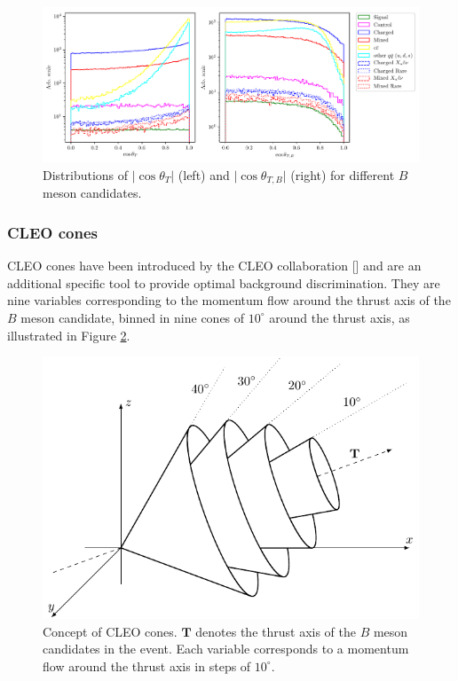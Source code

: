 \documentclass[  headings=standardclasses,
  headings=big,oneside,a4paper,openany,12pt]{scrbook}
\begin{document}
\begin{figure}[H]
\centering
\captionsetup{width=0.8\linewidth}
\includegraphics[width=\linewidth]{fig/cs_cosplots}
\caption{Distributions of $\vert \cos\theta_T\vert$ (left) and $\vert \cos\theta_{T,B}\vert$ (right) for different $B$ meson candidates.}
\label{fig:cosplots}
\end{figure}

\subsubsection{CLEO cones}
CLEO cones have been introduced by the CLEO collaboration [] and are an additional specific tool to provide optimal background discrimination. They are nine variables corresponding to the momentum flow around the thrust axis of the $B$ meson candidate, binned in nine cones of $10^\circ$ around the thrust axis, as illustrated in Figure \ref{fig:ccones}. 

\begin{figure}[H]
\centering
\captionsetup{width=0.8\linewidth}
\includegraphics[scale=1]{texfig/CCones}
\caption{Concept of CLEO cones. $\mathbf{T}$ denotes the thrust axis of the $B$ meson candidates in the event. Each variable corresponds to a momentum flow around the thrust axis in steps of $10^\circ$.}
\label{fig:ccones}
\end{figure}
\end{document}
